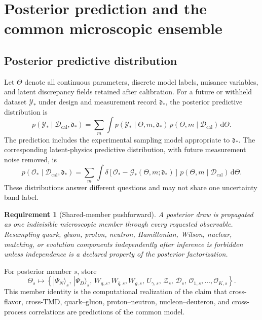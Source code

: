 \documentclass[11pt]{article}
\newtheorem{requirement}[definition]{Requirement}
\newcommand{\dd}{\mathrm{d}}
\newcommand{\cO}{\mathcal O}
\newcommand{\cG}{\mathcal G}
\newcommand{\cZ}{\mathcal Z}
\newcommand{\cD}{\mathcal D}
\newcommand{\cY}{\mathcal Y}
\newcommand{\caldata}{\mathcal D_{\mathrm{cal}}}
\begin{document}
\section{Posterior prediction and the common microscopic ensemble}
\label{sec:posterior-prediction}

\subsection{Posterior predictive distribution}

Let \(\Theta\) denote all continuous parameters, discrete model labels,
nuisance variables, and latent discrepancy fields retained after calibration.
For a future or withheld dataset \(\cY_*\) under design and measurement record
\(\mathfrak d_*\), the posterior predictive distribution is
\begin{equation}
 p(\cY_*\mid\caldata,\mathfrak d_*)
 =
 \sum_m\int
 p(\cY_*\mid\Theta,m,\mathfrak d_*)\,
 p(\Theta,m\mid\caldata)\,
 \dd\Theta .
 \label{eq:posterior-predictive-general}
\end{equation}
The prediction includes the experimental sampling model appropriate to
\(\mathfrak d_*\).  The corresponding latent-physics predictive distribution,
with future measurement noise removed, is
\begin{equation}
 p(\cO_*\mid\caldata,\mathfrak d_*)
 =
 \sum_m\int
 \delta\!\left[
 \cO_*-\cG_*(\Theta,m;\mathfrak d_*)
 \right]\,
 p(\Theta,m\mid\caldata)\,
 \dd\Theta .
 \label{eq:latent-predictive}
\end{equation}
These distributions answer different questions and may not share one
uncertainty band label.

\begin{requirement}[Shared-member pushforward]
A posterior draw is propagated as one indivisible microscopic member through
every requested observable.  Resampling quark, gluon, proton, neutron,
Hamiltonian, Wilson, nuclear, matching, or evolution components independently
after inference is forbidden unless independence is a declared property of the
posterior factorization.
\end{requirement}

For posterior member \(s\), store
\begin{equation}
 \Theta_s
 \longmapsto
 \left\{
 |\Psi_N\rangle_s,\,
 |\Psi_D\rangle_s,\,
 W_{q,s},W_{\bar q,s},W_{g,s},\,
 U_{\gamma,s},\,
 \cZ_s,\,
 \cD_s,\,
 \cO_{1,s},\ldots,\cO_{K,s}
 \right\}.
 \label{eq:common-member-map}
\end{equation}
This member identity is the computational realization of the claim that
cross-flavor, cross-TMD, quark--gluon, proton--neutron, nucleon--deuteron, and
cross-process correlations are predictions of the common model.
\end{document}
